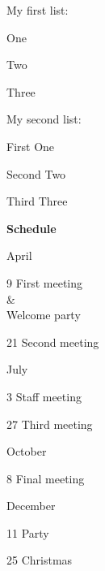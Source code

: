 \documentclass[a4paper, 11pt]{article}
\begin{document}
\begin{example}{}
    My first list:\\
    \begin{PLTBoxRaster}[handwriting, palette = toasted-peach]
        \item One
        \item Two
        \item Three
    \end{PLTBoxRaster}

    \bigskip
    My second list:\\
    \begin{PLTBoxRaster}[handwriting, palette = sting-has-sprung]
        \item [First] One
        \item [Second] Two
        \item [Third] Three
    \end{PLTBoxRaster}
\end{example}

\noindent\textbf{Schedule}

\begin{example}{}
    \begin{PLTBoxRaster}
        \item [April]
        \begin{PLTBoxRaster}
            \item [9] First meeting\\\&\\Welcome party
            \item [21] Second meeting
        \end{PLTBoxRaster}
        \item [July]
        \begin{PLTBoxRaster}
            \item [3] Staff meeting
            \item [27] Third meeting
        \end{PLTBoxRaster}
        \item [October]
        \begin{PLTBoxRaster}
            \item [8] Final meeting
        \end{PLTBoxRaster}
        \item [December]
        \begin{PLTBoxRaster}
            \item [11] Party
            \item [25] Christmas
        \end{PLTBoxRaster}
    \end{PLTBoxRaster}
\end{example}
\end{document}
